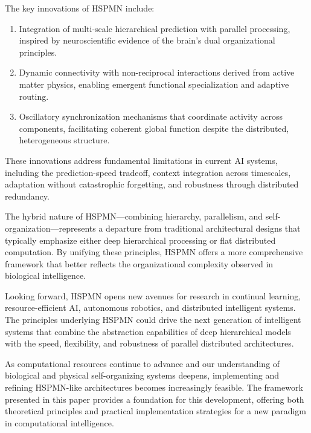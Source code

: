 \documentclass[11pt,a4paper,twocolumn]{article}
\begin{document}
The key innovations of HSPMN include:

\begin{enumerate}
    \item Integration of multi-scale hierarchical prediction with parallel processing, inspired by neuroscientific evidence of the brain's dual organizational principles.

    \item Dynamic connectivity with non-reciprocal interactions derived from active matter physics, enabling emergent functional specialization and adaptive routing.

    \item Oscillatory synchronization mechanisms that coordinate activity across components, facilitating coherent global function despite the distributed, heterogeneous structure.
\end{enumerate}

These innovations address fundamental limitations in current AI systems, including the prediction-speed tradeoff, context integration across timescales, adaptation without catastrophic forgetting, and robustness through distributed redundancy.

The hybrid nature of HSPMN—combining hierarchy, parallelism, and self-organization—represents a departure from traditional architectural designs that typically emphasize either deep hierarchical processing or flat distributed computation. By unifying these principles, HSPMN offers a more comprehensive framework that better reflects the organizational complexity observed in biological intelligence.

Looking forward, HSPMN opens new avenues for research in continual learning, resource-efficient AI, autonomous robotics, and distributed intelligent systems. The principles underlying HSPMN could drive the next generation of intelligent systems that combine the abstraction capabilities of deep hierarchical models with the speed, flexibility, and robustness of parallel distributed architectures.

As computational resources continue to advance and our understanding of biological and physical self-organizing systems deepens, implementing and refining HSPMN-like architectures becomes increasingly feasible. The framework presented in this paper provides a foundation for this development, offering both theoretical principles and practical implementation strategies for a new paradigm in computational intelligence.
\end{document}
